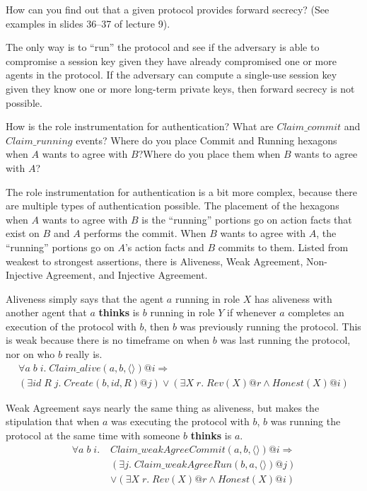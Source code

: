 \begin{questions}
\question{} How can you find out that a given protocol provides forward secrecy? (See examples in slides 36--37 of lecture 9).
  \begin{solution}
    The only way is to ``run'' the protocol and see if the adversary is able to compromise a session key given they have already compromised one or more agents in the protocol.
    If the adversary can compute a single-use session key given they know one or more long-term private keys, then forward secrecy is not possible.
  \end{solution}

\question{} How is the role instrumentation for authentication? What are $Claim\_commit$ and $Claim\_running$ events? Where do you place Commit and Running hexagons when $A$ wants to agree with $B$?\@ Where do you place them when $B$ wants to agree with $A$?\@
  \begin{solution}
    The role instrumentation for authentication is a bit more complex, because there are multiple types of authentication possible.
    The placement of the hexagons when $A$ wants to agree with $B$ is the ``running'' portions go on action facts that exist on $B$ and $A$ performs the commit.
    When $B$ wants to agree with $A$, the ``running'' portions go on $A$'s action facts and $B$ commits to them.
    Listed from weakest to strongest assertions, there is Aliveness, Weak Agreement, Non-Injective Agreement, and Injective Agreement.

    Aliveness simply says that the agent $a$ running in role $X$ has aliveness with another agent that $a$ \textbf{thinks} is $b$ running in role $Y$ if whenever $a$ completes an execution of the protocol with $b$, then $b$ was previously running the protocol.
    This is weak because there is no timeframe on when $b$ was last running the protocol, nor on who $b$ really is.
    \begin{multline}\label{eq:Aliveness}
      \forall a\; b\; i.\; Claim\_alive(a, b, \langle \rangle)@i \Rightarrow \\
      (\exists id \; R\; j.\; Create(b, id, R)@j) \vee (\exists X\; r.\; Rev(X)@r \wedge Honest(X)@i)
    \end{multline}

    Weak Agreement says nearly the same thing as aliveness, but makes the stipulation that when $a$ was executing the protocol with $b$, $b$ was running the protocol at the same time with someone $b$ \textbf{thinks} is $a$.
    \begin{equation}\label{eq:Weak_Agreement}
      \begin{aligned}
        \forall a\; b\; i.\; &Claim\_weakAgreeCommit(a, b, \langle \rangle)@i \Rightarrow \\
        &(\exists j.\; Claim\_weakAgreeRun(b, a, \langle \rangle)@j) \\
        &\vee (\exists X\; r.\; Rev(X)@r \wedge Honest(X)@i) \\
      \end{aligned}
    \end{equation}


\end{solution}
\end{questions}
